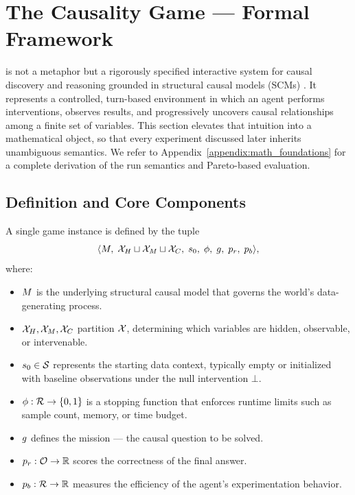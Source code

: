 \section{The Causality Game — Formal Framework}
\label{sec:formaldefinition}
\game is not a metaphor but a rigorously specified interactive system for causal discovery and reasoning grounded in structural causal models (SCMs) \citep{pearl2009causality}. 
It represents a controlled, turn-based environment in which an agent performs interventions, observes results, and progressively uncovers causal relationships among a finite set of variables. 
This section elevates that intuition into a mathematical object, so that every experiment discussed later inherits unambiguous semantics. We refer to Appendix~\ref{appendix:math_foundations} for a complete derivation of the run semantics and Pareto-based evaluation.

\subsection{Definition and Core Components}
A single game instance is defined by the tuple
\[
    \langle 
        M,\; \mathcal{X}_H \sqcup \mathcal{X}_M \sqcup \mathcal{X}_C,\;
        s_0,\; \phi,\;
        g,\; p_r,\; p_b
    \rangle ,
\]
where:
\begin{itemize}
    \item $M$ is the underlying structural causal model that governs the world’s data-generating process.
    \item $\mathcal{X}_H, \mathcal{X}_M, \mathcal{X}_C$ partition $\mathcal{X}$, determining which variables are hidden, observable, or intervenable.
    \item $\initstate \in \statespace$ represents the starting data context, typically empty or initialized with baseline observations under the null intervention $\bot$.
    \item $\phi : \runs \to \{0,1\}$ is a stopping function that enforces runtime limits such as sample count, memory, or time budget.
    \item $g$ defines the mission — the causal question to be solved.
    \item $\resultmetric : \outputspace \to \mathbb{R}$ scores the correctness of the final answer.
    \item $\behaviormetric : \runs \to \mathbb{R}$ measures the efficiency of the agent’s experimentation behavior.
\end{itemize}

